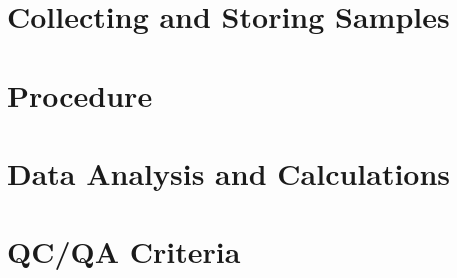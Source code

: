 \documentclass[12pt]{../SOP2}
\begin{document}
\section{Collecting and Storing Samples}
\section{Procedure}
\section{Data Analysis and Calculations}
\section{QC/QA Criteria}
\end{document}
